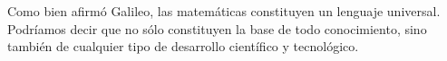 \documentclass{article}
\begin{document}
Como bien afirmó {\sffamily Galileo}, las matemáticas constituyen 
un lenguaje universal. {\ttfamily Podríamos decir que no sólo constituyen 
la {\rmfamily base de todo conocimiento}, sino también de cualquier tipo de
desarrollo científico y tecnológico}.
\end{document}
